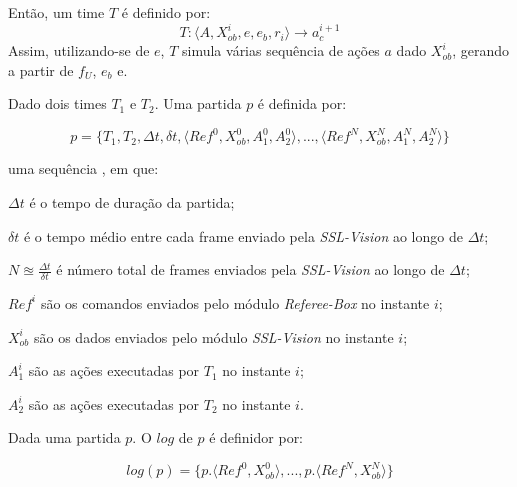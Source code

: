 \begin{defi}[Time]
\begin{description}
  \end{description}

  Então, um time $T$ é definido por:
  \[
    T: \langle A, X_{ob}^{i}, e, e_b, r_i \rangle \longrightarrow a_c^{i+1}
  \]
  Assim, utilizando-se de $e$, $T$ simula várias sequência de ações $a$ dado $X_{ob}^{i}$,
  gerando  a partir de $f_{U}$, $e_b$ e.
\end{defi}

\begin{defi}[Partida]
  Dado dois times $T_1$ e $T_2$. Uma partida $p$ é definida por:

  \[
   p = \lbrace T_1, T_2, \Delta t, \delta t, \langle Ref^{0}, X_{ob}^{0}, A_1^{0}, A_2^{0}\rangle, 
    ..., \langle Ref^{N}, X_{ob}^{N}, A_1^{N}, A_2^{N} \rangle \rbrace
 \]

  uma sequência , em que:
  \begin{description}
    \item $\Delta t$ é o tempo de duração da partida;
    \item $\delta t$ é o tempo médio entre cada frame enviado pela \textit{SSL-Vision} ao longo de $\Delta t$;
    \item $N \approxeq \frac{\Delta t}{\delta t}$ é número total de frames enviados pela \textit{SSL-Vision}
  ao longo de $\Delta t$;
    \item $Ref^{i}$ são os comandos enviados pelo módulo \textit{Referee-Box} no instante $i$;
    \item $X_{ob}^{i}$ são os dados enviados pelo módulo \textit{SSL-Vision} no instante $i$;
    \item $A_1^{i}$ são as ações executadas por $T_1$ no instante $i$;
    \item $A_2^{i}$ são as ações executadas por $T_2$ no instante $i$.
  \end{description}
\end{defi}

\begin{defi}[Logs]
  Dada uma partida $p$. O $log$ de $p$ é definidor por:

  \[
    log(p) = \lbrace p.\langle Ref^{0}, X_{ob}^{0}\rangle, ..., p.\langle Ref^{N}, X_{ob}^{N}\rangle \rbrace
  \]
\end{defi}
